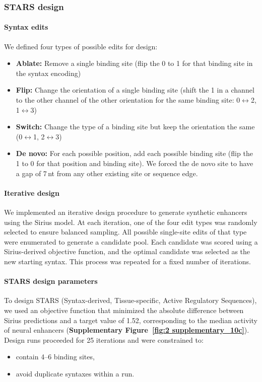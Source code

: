 \subsubsection{STARS design}

\paragraph{Syntax edits}

We defined four types of possible edits for design:
\begin{itemize}
  \item \textbf{Ablate:} Remove a single binding site (flip the 0 to 1 for that binding site in the syntax encoding)
  \item \textbf{Flip:} Change the orientation of a single binding site (shift the 1 in a channel to the other channel of the other orientation for the same binding site: 0\(\leftrightarrow\)2, 1\(\leftrightarrow\)3)
  \item \textbf{Switch:} Change the type of a binding site but keep the orientation the same (0\(\leftrightarrow\)1, 2\(\leftrightarrow\)3)
  \item \textbf{De novo:} For each possible position, add each possible binding site (flip the 1 to 0 for that position and binding site). We forced the de novo site to have a gap of 7\,nt from any other existing site or sequence edge.
\end{itemize}

\paragraph{Iterative design}

We implemented an iterative design procedure to generate synthetic enhancers using the Sirius model. At each iteration, one of the four edit types was randomly selected to ensure balanced sampling. All possible single-site edits of that type were enumerated to generate a candidate pool. Each candidate was scored using a Sirius-derived objective function, and the optimal candidate was selected as the new starting syntax. This process was repeated for a fixed number of iterations.

\paragraph{STARS design parameters}

To design STARS (Syntax-derived, Tissue-specific, Active Regulatory Sequences), we used an objective function that minimized the absolute difference between Sirius predictions and a target value of 1.52, corresponding to the median activity of neural enhancers (\textbf{Supplementary Figure~\ref{fig:2 supplementary_10c}}). Design runs proceeded for 25 iterations and were constrained to:
\begin{itemize}
  \item contain 4--6 binding sites,
  \item avoid duplicate syntaxes within a run.
\end{itemize}

